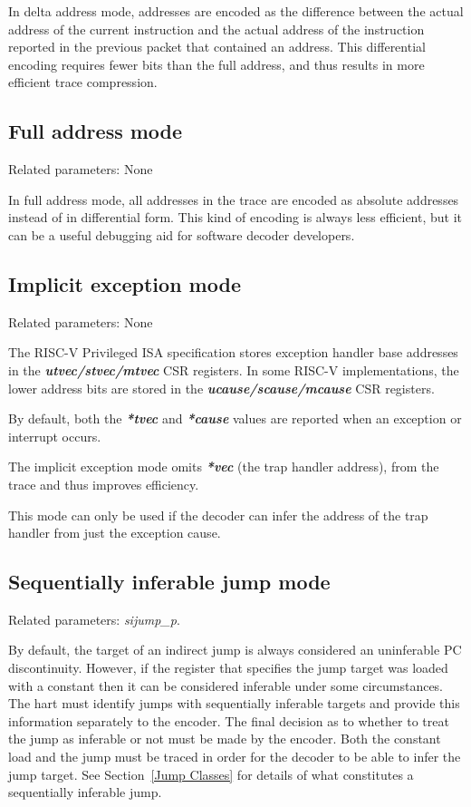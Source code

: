 In delta address mode, addresses are encoded as the difference between the actual address of 
the current instruction and the actual address of the instruction reported in the 
previous packet that contained an address.  This differential encoding requires fewer bits than 
the full address, and thus results in more efficient trace compression.

\subsection{Full address mode} \label{sec:full-address}

Related parameters: None

In full address mode, all addresses in the trace are encoded as absolute addresses instead
of in differential form. This kind of encoding is always less efficient, but it can be a useful 
debugging aid for software decoder developers.

\subsection{Implicit exception mode} \label{sec:implicit-exception}

Related parameters: None

The RISC-V Privileged ISA specification stores exception handler base
addresses in the \textbf{\textit{utvec/stvec/mtvec}} CSR registers.
In some RISC-V implementations, the lower address bits are stored in
the \textbf{\textit{ucause/scause/mcause}} CSR registers.

By default, both the \textbf{\textit{*tvec}} and \textbf{\textit{*cause}} 
values are reported when an exception or interrupt occurs.

The implicit exception mode omits \textbf{\textit{*vec}} (the trap handler address), 
from the trace and thus improves efficiency.

This mode can only be used if the decoder can infer the address of the trap handler
from just the exception cause.

\subsection{Sequentially inferable jump mode} \label{sec:si-jump}

Related parameters: \textit{sijump\_p}.

By default, the target of an indirect jump is always considered an uninferable PC discontinuity.  
However, if the register that specifies the jump target was loaded with a constant then it
can be considered inferable under some circumstances.  The hart must identify jumps with 
sequentially inferable targets and provide this information separately to the encoder.  The
final decision as to whether to treat the jump as inferable or not must be made by the encoder.
Both the constant load and the jump must be traced in order for the decoder to be able to
infer the jump target.  See Section~\ref{Jump Classes} for details of what constitutes a sequentially
inferable jump.

